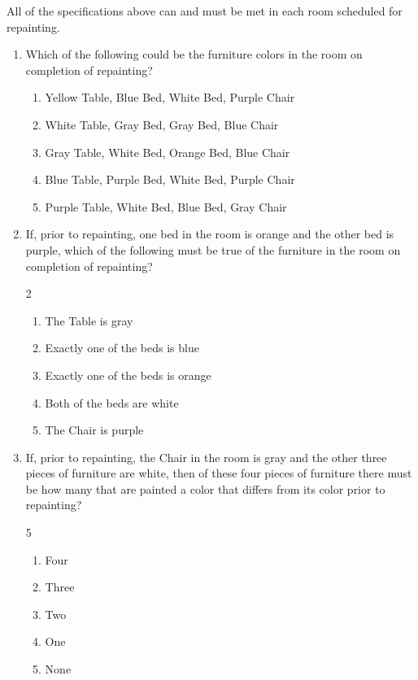 \documentclass[12pt]{article}
\begin{document}
All of the specifications above can and must be met in each room scheduled for repainting.\\[10pt]

\begin{enumerate}[label=\textbf{\arabic*.}, start=1]

    \item Which of the following could be the furniture colors in the room on completion of repainting?

    \begin{enumerate}[label=(\Alph*)]
        \item Yellow Table, Blue Bed, White Bed, Purple Chair
        \item White Table, Gray Bed, Gray Bed, Blue Chair
        \item Gray Table, White Bed, Orange Bed, Blue Chair
        \item Blue Table, Purple Bed, White Bed, Purple Chair
        \item Purple Table, White Bed, Blue Bed, Gray Chair
    \end{enumerate}


    \item If, prior to repainting, one bed in the room is orange and the other bed is purple, which of the following must be true of the furniture in the room on completion of repainting?
   \begin{multicols}{2}
    \begin{enumerate}[label=(\Alph*)]
        \item The Table is gray
        \item Exactly one of the beds is blue
        \item Exactly one of the beds is orange
        \item Both of the beds are white
        \item The Chair is purple
    \end{enumerate}
    \end{multicols}

    \item If, prior to repainting, the Chair in the room is gray and the other three pieces of furniture are white, then of these four pieces of furniture there must be how many that are painted a color that differs from its color prior to repainting?
   \begin{multicols}{5}
    \begin{enumerate}[label=(\Alph*)]
        \item Four
        \item Three
        \item Two
        \item One
        \item None
    \end{enumerate}
    \end{multicols}


\end{enumerate}
\end{document}
